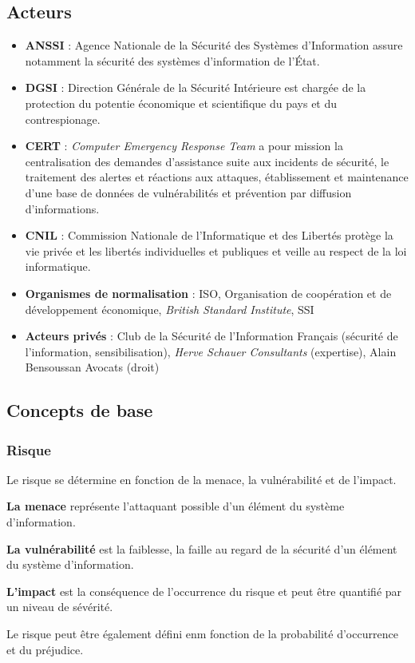 \documentclass[12pt, a4paper]{article}
\begin{document}
	\subsection{Acteurs}
	\begin{itemize}
		\item \textbf{ANSSI} : Agence Nationale de la Sécurité des Systèmes d'Information assure notamment la sécurité des systèmes d'information de l'État.
		\item \textbf{DGSI} : Direction Générale de la Sécurité Intérieure est chargée de la protection du potentie économique et scientifique du pays et du contrespionage.
		\item \textbf{CERT} : \textit{Computer Emergency Response Team} a pour mission la centralisation des demandes d'assistance suite aux incidents de sécurité, le traitement des alertes et réactions aux attaques, établissement et maintenance d'une base de données de vulnérabilités et prévention par diffusion d'informations.
		\item \textbf{CNIL} : Commission Nationale de l'Informatique et des Libertés protège la vie privée et les libertés individuelles et publiques et veille au respect de la loi informatique.
		\item \textbf{Organismes de normalisation} : ISO, Organisation de coopération et de développement économique, \textit{British Standard Institute}, SSI
		\item \textbf{Acteurs privés} : Club de la Sécurité de l'Information Français (sécurité de l'information, sensibilisation), \textit{Herve Schauer Consultants} (expertise), Alain Bensoussan Avocats (droit)
	\end{itemize}
	\subsection{Concepts de base}
	\subsubsection{Risque}
	Le risque se détermine en fonction de la menace, la vulnérabilité et de l'impact.
	\par
	\textbf{La menace} représente l'attaquant possible d'un élément du système d'information.
	\par
	\textbf{La vulnérabilité} est la faiblesse, la faille au regard de la sécurité d'un élément du système d'information.
	\par
	\textbf{L'impact} est la conséquence de l'occurrence du risque et peut être quantifié par un niveau de sévérité.
	\par
	Le risque peut être également défini enm fonction de la probabilité d'occurrence et du préjudice.
\end{document}
